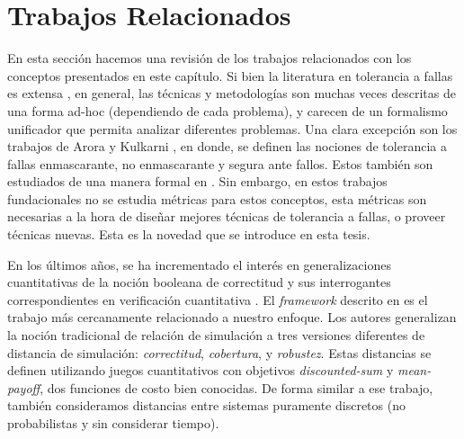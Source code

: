 \section{Trabajos Relacionados} \label{sec:related_work_mask}

    En esta sección hacemos una revisión de los trabajos relacionados con los conceptos presentados en este capítulo. Si bien la literatura en tolerancia a fallas es extensa \cite{ShoomanBook, KrishnaBook, ReliabilityBook}, en general, las técnicas y metodologías son muchas veces descritas de una forma ad-hoc (dependiendo de cada problema), y carecen de un formalismo unificador que permita analizar diferentes problemas. Una clara excepción son los trabajos de Arora \cite{AroraGouda93} y Kulkarni \cite{DBLP:conf/ftrtft/KulkarniA00}, en donde, se definen las nociones de tolerancia a fallas enmascarante, no enmascarante y segura ante fallos. Estos también son estudiados de una manera formal en \cite{Avizienis2004}. Sin embargo, en estos trabajos fundacionales no se estudia métricas para estos conceptos, esta métricas son necesarias a la hora de diseñar mejores técnicas de tolerancia a fallas, o proveer técnicas nuevas.  Esta es la novedad que se introduce en esta tesis.

En los últimos años, se ha incrementado el interés en generalizaciones cuantitativas de la noción booleana de correctitud y sus interrogantes correspondientes en verificación cuantitativa \cite{BokerCHK14,CernyHR12,Henzinger10,Henzinger13}.
El \textit{framework} descrito en \cite{CernyHR12} es el trabajo más cercanamente relacionado a nuestro enfoque. 
Los autores generalizan la noción tradicional de relación de simulación a tres versiones diferentes de distancia de simulación: \emph{correctitud}, \emph{cobertura}, y \emph{robustez}.
Estas distancias se definen utilizando juegos cuantitativos con objetivos \emph{discounted-sum} 
y \emph{mean-payoff}, dos funciones de costo bien conocidas.
De forma similar a ese trabajo, también consideramos distancias entre sistemas puramente discretos (no probabilistas y sin considerar tiempo).

